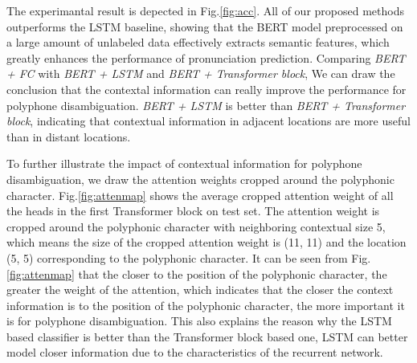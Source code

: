 \documentclass[a4paper]{article}
\begin{document}
%	
%		
%		
%



The experimantal result is depected in Fig.\ref{fig:acc}. All of our proposed methods outperforms the LSTM baseline, showing that the BERT model preprocessed on a large amount of unlabeled data effectively extracts semantic features, which greatly enhances the performance of pronunciation prediction. Comparing  \textit{ BERT + FC } with \textit{  BERT + LSTM} and \textit{ BERT + Transformer block}, We can draw the conclusion that the contextal information can really improve the performance for polyphone disambiguation. \textit{ BERT + LSTM} is better than \textit{ BERT + Transformer block}, indicating that contextual information in adjacent locations are more useful than in distant locations.

To further illustrate the impact of contextual information for polyphone disambiguation, we draw the attention weights cropped around the polyphonic character. Fig.\ref{fig:attenmap} shows the average cropped attention weight of all the heads in the first Transformer block on test set. The attention weight is cropped around the polyphonic character with neighboring contextual size 5, which means the size of the cropped attention weight is (11, 11) and the location (5, 5) corresponding to the polyphonic character. It can be seen from Fig.\ref{fig:attenmap} that the closer to the position of the polyphonic character, the greater the weight of the attention, which indicates that the closer the context information is to the position of the polyphonic character, the more important it is for polyphone disambiguation. This also explains the reason why the LSTM based classifier is better than the Transformer block based one, LSTM can better model closer information due to the characteristics of the recurrent network.

\end{document}
